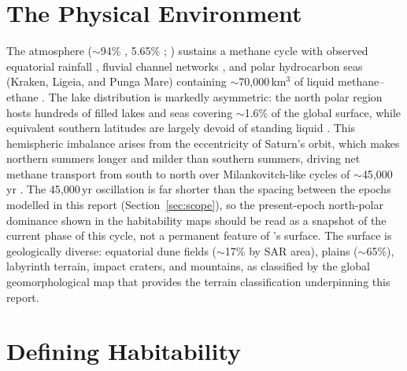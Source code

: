 \section{The Physical Environment}
\label{sec:titan_environment}

The atmosphere ($\sim$94\% , 5.65\% ; \citealt{Niemann2005})
sustains a methane cycle with observed equatorial rainfall \citep{Turtle2011},
fluvial channel networks \citep{Miller2021channels}, and polar hydrocarbon
seas (Kraken, Ligeia, and Punga Mare) containing $\sim$70{,}000\,km$^3$ of
liquid methane--ethane \citep{Mastrogiuseppe2019,Malaska2025}.  The lake distribution is markedly asymmetric: the north polar region hosts hundreds of filled lakes and seas covering $\sim$1.6\% of the global surface, while equivalent southern latitudes are largely devoid of standing liquid \citep{Aharonson2009}.  This hemispheric imbalance arises from the eccentricity of Saturn's orbit, which makes northern summers longer and milder than southern summers, driving net methane transport from south to north over Milankovitch-like cycles of $\sim$45{,}000\,yr \citep{Aharonson2009}.  The 45{,}000\,yr oscillation is far shorter than the spacing between the epochs modelled in this report (Section~\ref{sec:scope}), so the present-epoch north-polar dominance shown in the habitability maps should be read as a snapshot of the current phase of this cycle, not a permanent feature of \titan{}'s surface.  The surface is geologically diverse: equatorial dune fields ($\sim$17\% by SAR area), plains
($\sim$65\%), labyrinth terrain, impact craters, and mountains, as classified
by the \citet{Lopes2019} global geomorphological map that
provides the terrain classification underpinning this report.

\section{Defining Habitability}
\label{sec:defining_habitability}

